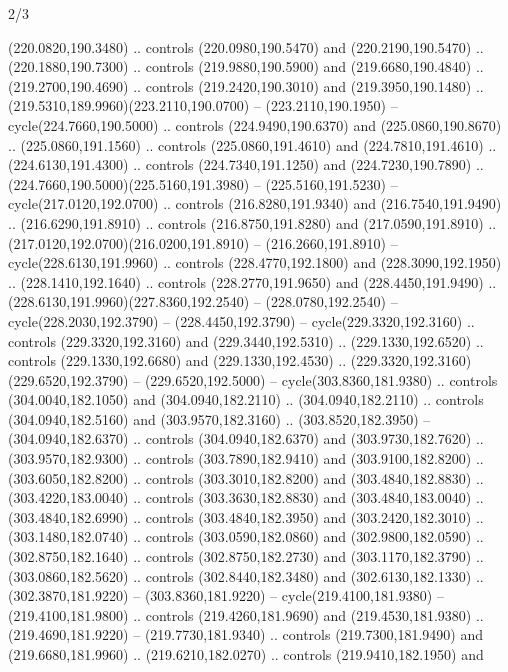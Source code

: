\begin{flagdescription}{2/3}
\begin{scope}[xshift=0.5\flaglength,yshift=0.5\flagwidth,scale=\flagwidth/259.2]
\begin{scope}[y=0.8pt, x=0.8pt, yscale=-1,shift={(-243,-162)}]
      (220.0820,190.3480) .. controls (220.0980,190.5470) and (220.2190,190.5470) ..
      (220.1880,190.7300) .. controls (219.9880,190.5900) and (219.6680,190.4840) ..
      (219.2700,190.4690) .. controls (219.2420,190.3010) and (219.3950,190.1480) ..
      (219.5310,189.9960)(223.2110,190.0700) -- (223.2110,190.1950) --
      cycle(224.7660,190.5000) .. controls (224.9490,190.6370) and
      (225.0860,190.8670) .. (225.0860,191.1560) .. controls (225.0860,191.4610) and
      (224.7810,191.4610) .. (224.6130,191.4300) .. controls (224.7340,191.1250) and
      (224.7230,190.7890) .. (224.7660,190.5000)(225.5160,191.3980) --
      (225.5160,191.5230) -- cycle(217.0120,192.0700) .. controls
      (216.8280,191.9340) and (216.7540,191.9490) .. (216.6290,191.8910) .. controls
      (216.8750,191.8280) and (217.0590,191.8910) ..
      (217.0120,192.0700)(216.0200,191.8910) -- (216.2660,191.8910) --
      cycle(228.6130,191.9960) .. controls (228.4770,192.1800) and
      (228.3090,192.1950) .. (228.1410,192.1640) .. controls (228.2770,191.9650) and
      (228.4450,191.9490) .. (228.6130,191.9960)(227.8360,192.2540) --
      (228.0780,192.2540) -- cycle(228.2030,192.3790) -- (228.4450,192.3790) --
      cycle(229.3320,192.3160) .. controls (229.3320,192.3160) and
      (229.3440,192.5310) .. (229.1330,192.6520) .. controls (229.1330,192.6680) and
      (229.1330,192.4530) .. (229.3320,192.3160)(229.6520,192.3790) --
      (229.6520,192.5000) -- cycle(303.8360,181.9380) .. controls
      (304.0040,182.1050) and (304.0940,182.2110) .. (304.0940,182.2110) .. controls
      (304.0940,182.5160) and (303.9570,182.3160) .. (303.8520,182.3950) --
      (304.0940,182.6370) .. controls (304.0940,182.6370) and (303.9730,182.7620) ..
      (303.9570,182.9300) .. controls (303.7890,182.9410) and (303.9100,182.8200) ..
      (303.6050,182.8200) .. controls (303.3010,182.8200) and (303.4840,182.8830) ..
      (303.4220,183.0040) .. controls (303.3630,182.8830) and (303.4840,183.0040) ..
      (303.4840,182.6990) .. controls (303.4840,182.3950) and (303.2420,182.3010) ..
      (303.1480,182.0740) .. controls (303.0590,182.0860) and (302.9800,182.0590) ..
      (302.8750,182.1640) .. controls (302.8750,182.2730) and (303.1170,182.3790) ..
      (303.0860,182.5620) .. controls (302.8440,182.3480) and (302.6130,182.1330) ..
      (302.3870,181.9220) -- (303.8360,181.9220) -- cycle(219.4100,181.9380) --
      (219.4100,181.9800) .. controls (219.4260,181.9690) and (219.4530,181.9380) ..
      (219.4690,181.9220) -- (219.7730,181.9340) .. controls (219.7300,181.9490) and
      (219.6680,181.9960) .. (219.6210,182.0270) .. controls (219.9410,182.1950) and

\end{scope}
\end{scope}
\end{flagdescription}
